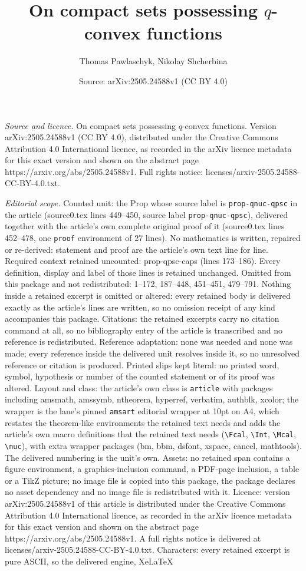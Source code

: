 \documentclass[10pt,a4paper]{amsart}
\title[On compact sets possessing $q$-convex functions]{On compact sets possessing $q$-convex functions}
\author{Thomas Pawlaschyk, Nikolay Shcherbina}
\date{Source: arXiv:2505.24588v1 (CC BY 4.0)}
\begin{document}
\maketitle

\noindent\emph{Source and licence.} On compact sets possessing $q$-convex functions. Version arXiv:2505.24588v1 (CC BY 4.0), distributed under the Creative Commons Attribution 4.0 International licence, as recorded in the arXiv licence metadata for this exact version and shown on the abstract page https://arxiv.org/abs/2505.24588v1. Full rights notice: licenses/arxiv-2505.24588-CC-BY-4.0.txt.\par\smallskip

\noindent\textit{Editorial scope.} Counted unit: the Prop whose source label is \texttt{prop-qnuc-qpsc} in the article (source0.tex lines 449--450, source label \texttt{prop-qnuc-qpsc}), delivered together with the article's own complete original proof of it (source0.tex lines 452--478, one \texttt{proof} environment of 27 lines). No mathematics is written, repaired or re-derived: statement and proof are the article's own text line for line. Required context retained uncounted: prop-qpsc-caps (lines 173--186). Every definition, display and label of those lines is retained unchanged. Omitted from this package and not redistributed: 1--172, 187--448, 451--451, 479--791. Nothing inside a retained excerpt is omitted or altered: every retained body is delivered exactly as the article's lines are written, so no omission receipt of any kind accompanies this package. Citations: the retained excerpts carry no citation command at all, so no bibliography entry of the article is transcribed and no reference is redistributed. Reference adaptation: none was needed and none was made; every reference inside the delivered unit resolves inside it, so no unresolved reference or citation is produced. Printed slips kept literal: no printed word, symbol, hypothesis or number of the counted statement or of its proof was altered. Layout and class: the article's own class is \texttt{article} with packages including amsmath, amssymb, ntheorem, hyperref, verbatim, authblk, xcolor; the wrapper is the lane's pinned \texttt{amsart} editorial wrapper at 10pt on A4, which restates the theorem-like environments the retained text needs and adds the article's own macro definitions that the retained text needs (\texttt{\textbackslash Fcal}, \texttt{\textbackslash Int}, \texttt{\textbackslash Mcal}, \texttt{\textbackslash nuc}), with extra wrapper packages (bm, bbm, dsfont, xspace, cancel, mathtools). The delivered numbering is the unit's own. Assets: no retained span contains a figure environment, a graphics-inclusion command, a PDF-page inclusion, a table or a TikZ picture; no image file is copied into this package, the package declares no asset dependency and no image file is redistributed with it. Licence: version arXiv:2505.24588v1 of this article is distributed under the Creative Commons Attribution 4.0 International licence, as recorded in the arXiv licence metadata for this exact version and shown on the abstract page https://arxiv.org/abs/2505.24588v1. A full rights notice is delivered at licenses/arxiv-2505.24588-CC-BY-4.0.txt. Characters: every retained excerpt is pure ASCII, so the delivered engine, XeLaTeX 
\end{document}
